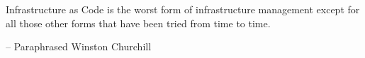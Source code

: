 \begin{oldquote}
Infrastructure as Code is the worst form of infrastructure management except for all those other forms that have been tried from time to time.

\raggedleft -- Paraphrased Winston Churchill
\end{oldquote}

